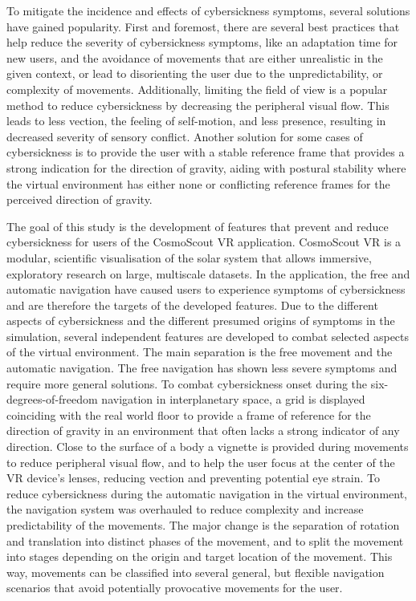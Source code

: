 To mitigate the incidence and effects of cybersickness symptoms, several solutions have gained popularity.
First and foremost, there are several best practices that help reduce the severity of cybersickness symptoms, like an
adaptation time for new users, and the avoidance of movements that are either unrealistic in the given context, or
lead to disorienting the user due to the unpredictability, or complexity of movements.
Additionally, limiting the field of view is a popular method to reduce cybersickness by decreasing the peripheral
visual flow.
This leads to less vection, the feeling of self-motion, and less presence, resulting in decreased severity of sensory
conflict.
Another solution for some cases of cybersickness is to provide the user with a stable reference frame that provides a
strong indication for the direction of gravity, aiding with postural stability where the virtual environment has
either none or conflicting reference frames for the perceived direction of gravity.

The goal of this study is the development of features that prevent and reduce cybersickness for users of the
CosmoScout VR application.
CosmoScout VR is a modular, scientific visualisation of the solar system that allows immersive, exploratory research
on large, multiscale datasets.
In the application, the free and automatic navigation have caused users to experience symptoms of cybersickness and
are therefore the targets of the developed features.
Due to the different aspects of cybersickness and the different presumed origins of symptoms in the simulation,
several independent features are developed to combat selected aspects of the virtual environment.
The main separation is the free movement and the automatic navigation.
The free navigation has shown less severe symptoms and require more general solutions.
To combat cybersickness onset during the six-degrees-of-freedom navigation in interplanetary space, a grid is
displayed coinciding with the real world floor to provide a frame of reference for the direction of gravity in an
environment that often lacks a strong indicator of any direction.
Close to the surface of a body a vignette is provided during movements to reduce peripheral visual flow, and to help
the user focus at the center of the VR device's lenses, reducing vection and preventing potential eye strain.
To reduce cybersickness during the automatic navigation in the virtual environment, the navigation system was
overhauled to reduce complexity and increase predictability of the movements.
The major change is the separation of rotation and translation into distinct phases of the movement, and to split the
movement into stages depending on the origin and target location of the movement.
This way, movements can be classified into several general, but flexible navigation scenarios that avoid potentially
provocative movements for the user.

